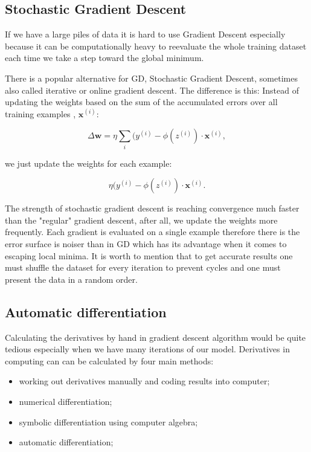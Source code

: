 \documentclass[a4paper,oneside,openright,11pt]{book}
\begin{document}
\subsection{Stochastic Gradient Descent}

If we have a large piles of data it is hard to use Gradient Descent especially because it can be computationally heavy to reevaluate the whole training dataset each time we take a step toward the global minimum.

There is a popular alternative for GD, Stochastic Gradient Descent, sometimes also called iterative or online gradient descent. The difference is this: Instead of updating the weights based on the sum of the accumulated errors over all training examples , $\textbf{x}^{(i)}$:

\begin{equation}
    \Delta \textbf{w} = \eta \sum_{i}^{}(y^{(i)} - \phi(z^{(i)}) \cdot \textbf{x}^{(i)},
\end{equation}


we just update the weights for each example:

\begin{equation}
    \eta (y^{(i)} - \phi(z^{(i)}) \cdot \textbf{x}^{(i)}.
\end{equation}

The strength of stochastic gradient descent is reaching convergence much faster than the "regular" gradient descent, after all, we update the weights more frequently. Each gradient is evaluated on a single example therefore there is the error surface is noiser than in GD which has its advantage when it comes to escaping local minima. It is worth to mention that to get accurate results one must shuffle the dataset for every iteration to prevent cycles and one must present the data in a random order. \cite{raschka}


\subsection{Automatic differentiation}


Calculating the derivatives by hand in gradient descent algorithm would be quite tedious especially when we have many iterations of our model. Derivatives in computing can can be calculated by four main methods:

\begin{itemize}
    \item working out derivatives manually and coding results into computer;
    \item  numerical differentiation;
    \item symbolic differentiation using computer algebra;
    \item automatic differentiation;
\end{itemize}
\end{document}
